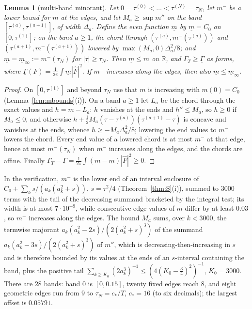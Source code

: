 \documentclass[11pt]{amsart}
\newtheorem{lemma}[theorem]{Lemma}
\theoremstyle{definition}
\theoremstyle{remark}
\newcommand{\R}{\mathbb R}
\newcommand{\Fh}{\widehat F}
\begin{document}
\begin{lemma}[multi-band minorant]\label{lem:multiband}
Let $0=\tau^{(0)}<\dots<\tau^{(N)}=\tau_N$, let $m^-$ be a lower bound for $m$ at the edges,
and let $M_a\ge\sup m''$ on the band $[\tau^{(a)},\tau^{(a+1)}]$, of width $\Delta_a$. Define the even
function $\underline m$ by $\underline m=C_0$ on $[0,\tau^{(1)}]$; on the band $a\ge1$, the chord through
$(\tau^{(a)},m^-(\tau^{(a)}))$ and $(\tau^{(a+1)},m^-(\tau^{(a+1)}))$ lowered by $\max(M_a,0)\Delta_a^2/8$;
and $\underline m=\underline m_\infty:=m^-(\tau_N)$ for $|\tau|\ge\tau_N$. Then $\underline m\le m$ on
$\R$, and $\Gamma_T\ge\underline\Gamma$ as forms, where
$\underline\Gamma(F)=\frac1{2\pi}\int\underline m|\Fh|^2$. If $m^-$ increases along the edges, then also
$\underline m\le\underline m_\infty$.
\end{lemma}
\begin{proof}
On $[0,\tau^{(1)}]$ and beyond $\tau_N$ use that $m$ is increasing with $m(0)=C_0$
(Lemma~\ref{lem:mbounds}(i)). On a band $a\ge1$ let $L_a$ be the chord through the exact values and
$h=m-L_a$: $h$ vanishes at the ends and $h''\le M_a$, so $h\ge0$ if $M_a\le0$, and otherwise
$h+\frac12M_a(\tau-\tau^{(a)})(\tau^{(a+1)}-\tau)$ is concave and vanishes at the ends, whence
$h\ge-M_a\Delta_a^2/8$; lowering the end values to $m^-$ lowers the chord. Every end value of a
lowered chord is at most $m^-$ at that edge, hence at most $m^-(\tau_N)$ when $m^-$ increases along the
edges, and the chords are affine. Finally $\Gamma_T-\underline\Gamma=\frac1{2\pi}\int(m-\underline m)|\Fh|^2\ge0$.
\end{proof}
In the verification, $m^-$ is the lower end of an interval enclosure of $C_0+\sum_ks/(a_k(a_k^2+s))$, $s=\tau^2/4$
(Theorem~\ref{thm:S}(i)), summed to $3000$ terms with the tail of the decreasing summand bracketed by the
integral test; its width is at most $7\cdot10^{-9}$, while consecutive edge values of $m$ differ by at
least $0.03$, so $m^-$ increases along the edges. The bound $M_a$ sums, over $k<3000$, the termwise
majorant $a_k(a_k^2-2s)/(2(a_k^2+s)^3)$ of the summand $a_k(a_k^2-3s)/(2(a_k^2+s)^3)$ of $m''$, which is
decreasing-then-increasing in $s$ and is therefore bounded by its values at the ends of an $s$-interval
containing the band, plus the positive tail $\sum_{k\ge K_0}(2a_k^3)^{-1}\le(4(K_0-\frac34)^2)^{-1}$,
$K_0=3000$. There are $28$ bands: band $0$ is $[0,0.15]$, twenty fixed edges reach $8$, and eight
geometric edges run from $9$ to $\tau_N=c_*/T$, $c_*=16$ (to six decimals); the largest offset is $0.05791$.
\end{document}
